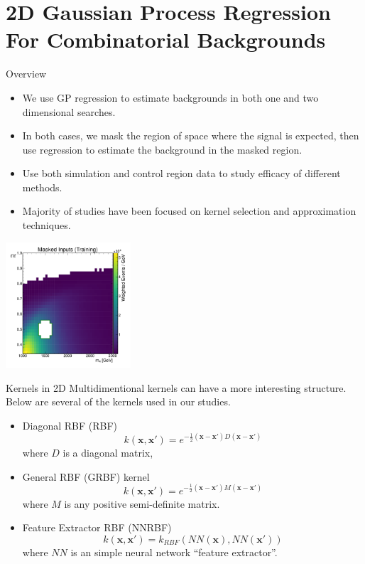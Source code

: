 \documentclass[10pt]{beamer}
\begin{document}
\section[Regression Results]{2D Gaussian Process Regression For Combinatorial Backgrounds}
\label{sec:2d-gauss-proc}

\begin{frame}{Overview}
  \begin{itemize}
  \item We use GP regression to estimate backgrounds in both one and two dimensional searches.
  \item In both cases, we mask the region of space where the signal is expected, then use regression to estimate the background in the masked region.
  \item Use both simulation and control region data to study efficacy of different methods. 
  \item Majority of studies have been focused on kernel selection and approximation techniques.
  \end{itemize}
  \begin{center}
    \includegraphics[width=0.35\textwidth]{figures/training_points}
  \end{center}
\end{frame}

\begin{frame}{Kernels in 2D}
  Multidimentional kernels can have a more interesting structure. Below are several of the kernels used in our studies.
  \begin{itemize}
  \item Diagonal RBF (RBF)
    \begin{equation}
      k(\bm{x},\bm{x'}) = e^{ -\frac{1}{2} \left(  \bm{x} - \bm{x'}\right) D \left(  \bm{x} - \bm{x'}\right)}
    \end{equation}
    where $D$ is a diagonal matrix,
  \item General RBF (GRBF) kernel
    \begin{equation}
      k(\bm{x},\bm{x'}) = e^{ -\frac{1}{2} \left(  \bm{x} - \bm{x'}\right) M \left(  \bm{x} - \bm{x'}\right)}
    \end{equation}
    where $M$ is any positive semi-definite matrix.
  \item Feature Extractor RBF (NNRBF)
    \begin{equation}
      k(\bm{x},\bm{x'}) =  k_{RBF}(NN(\bm{x}),NN(\bm{x'}))
    \end{equation}
    where $NN$ is an simple neural network ``feature extractor''.
  \end{itemize}
\end{frame}
\end{document}
